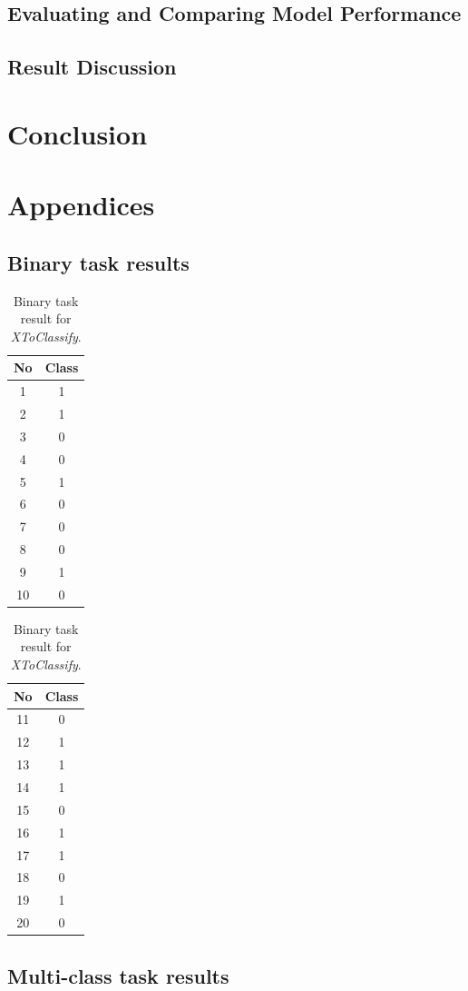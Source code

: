 \documentclass[11pt]{article}
\begin{document}
		\subsection{Evaluating and Comparing Model Performance}
		\subsection{Result Discussion}
	\section{Conclusion}

	\clearpage
	\appendix
	\section{Appendices}
		\subsection{Binary task results}
		\begin{center}
		  	\begin{table}[h]
		  		\small

		  	\centering

			\begin{tabular}[b]{| c | c|} 
				\hline
				No & Class \\
				\hline
				1 & 1 \\ 2 & 1 \\ 3 & 0 \\ 4 & 0 \\ 5 & 1 \\ 6 & 0 \\ 7 & 0 \\ 8 & 0 \\ 9 & 1 \\ 10 & 0 \\
				\hline
			\end{tabular}
			\begin{tabular}[b]{| c | c|} 
				\hline
				No & Class \\
				\hline
				11 & 0 \\ 12 & 1 \\ 13 & 1 \\ 14 & 1 \\ 15 & 0 \\ 16 & 1 \\ 17 & 1 \\ 18 & 0 \\ 19 & 1 \\ 20 & 0 \\
				\hline
			\end{tabular}
			\caption{Binary task result for \textit{XToClassify}.}
			\label{tbl:final_binary}
			\end{table}
		\end{center}
		\subsection{Multi-class task results}
\end{document}
